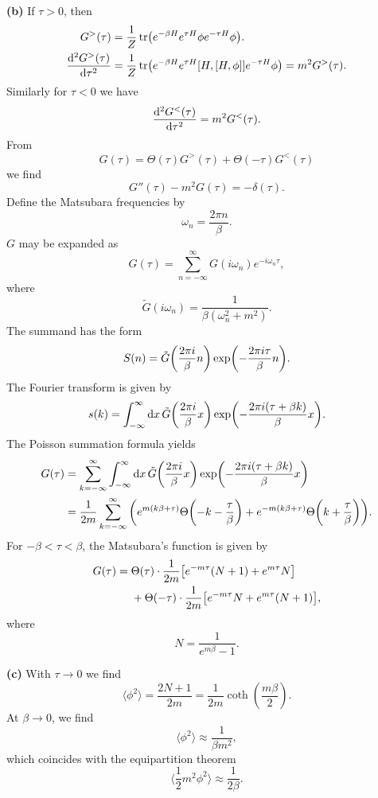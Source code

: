\documentclass{article}
\makeatletter
\newcommand*{\shifttext}[1]{%
  \settowidth{\@tempdima}{#1}%
  \hspace{-\@tempdima}#1%
}
\newcommand{\plabel}[1]{%
\shifttext{\textbf{#1}\quad}%
}
\makeatother
\begin{document}
\plabel{(b)}%
If $\tau > 0$, then
\begin{align*}
    G^>(\tau) &= \frac{1}{Z} \tr(e^{-\beta H} e^{\tau H} \phi e^{-\tau H} \phi). \\
    \dv[2]{G^{>}(\tau)}{\tau} &= \frac{1}{Z} \tr(e^{-\beta H} e^{\tau H} [H,[H,\phi]] e^{-\tau H} \phi) = m^2 G^>(\tau).
\end{align*}
Similarly for $\tau < 0$ we have
\[ \dv[2]{G^<(\tau)}{\tau} = m^2 G^<(\tau). \]
From
\[ G(\tau) = \Theta(\tau) G^>(\tau) + \Theta(-\tau) G^{<}(\tau) \]
we find
\[ G''(\tau) - m^2 G(\tau) = - \delta(\tau)
. \]
Define the Matsubara frequencies by
\[ \omega_n = \frac{2\pi n}{\beta}. \]
$G$ may be expanded as
\[ G(\tau) = \sum_{n=-\infty}^\infty G(i\omega_n) e^{-i\omega_n \tau}, \]
where
\[ \tilde{G}(i\omega_n) = \frac{1}{\beta (\omega_n^2 + m^2)}. \]
The summand has the form
\[ S(n) = \tilde{G}\qty(\frac{2\pi i}{\beta} n) \exp(-\frac{2\pi i \tau}{\beta}n). \]
The Fourier transform is given by
\[ s(k) = \int_{-\infty}^\infty \dd{x} \tilde{G}\qty(\frac{2\pi i}{\beta} x) \exp(-\frac{2\pi i (\tau + \beta k)}{\beta}x). \]
The Poisson summation formula yields
\begin{align*}
    G(\tau) &= \sum_{k=-\infty}^\infty \int_{-\infty}^\infty \dd{x} \tilde{G}\qty(\frac{2\pi i}{\beta} x) \exp(-\frac{2\pi i (\tau + \beta k)}{\beta}x) \\
    &= \frac{1}{2m} \sum_{k=-\infty}^\infty \qty(e^{m(k\beta + \tau)}\Theta\qty(- k - \frac{\tau}{\beta}) + e^{-m(k\beta + \tau)}\Theta\qty(k + \frac{\tau}{\beta})).
\end{align*}
For $-\beta < \tau < \beta$, the Matsubara's function is given by
\begin{align*}
    G(\tau) &= \Theta(\tau) \cdot \frac{1}{2m}\qty[e^{-m\tau}(N+1) + e^{m\tau}N] \\
    &\phantom{{}={}} + \Theta(-\tau) \cdot \frac{1}{2m}\qty[e^{-m\tau}N + e^{m\tau}(N+1)],
\end{align*}
where
\[ N = \frac{1}{e^{m\beta} - 1}. \]

\plabel{(c)}%
With $\tau\rightarrow 0$ we find
\[ \langle \phi^2 \rangle = \frac{2N+1}{2m} = \frac{1}{2m}\coth (\frac{m\beta}{2}). \]
At $\beta\rightarrow 0$, we find
\[ \langle \phi^2 \rangle \approx \frac{1}{\beta m^2}, \]
which coincides with the equipartition theorem
\[ \langle \frac{1}{2}m^2 \phi^2 \rangle \approx \frac{1}{2\beta}. \]
\end{document}
